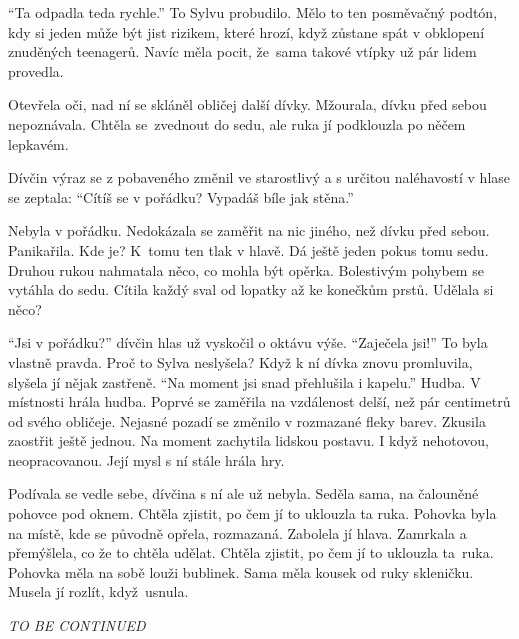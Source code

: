 \documentclass{article}
\begin{document}
	\enquote{Ta odpadla teda rychle.}
	To Sylvu probudilo.
	Mělo to ten posměvačný podtón, kdy si jeden může být jist rizikem,
	které hrozí, když zůstane spát v obklopení znuděných teenagerů.
	Navíc měla pocit, že~sama takové vtípky už pár lidem provedla.\par
	Otevřela oči, nad ní se skláněl obličej další dívky.
	Mžourala, dívku před sebou nepoznávala.
	Chtěla se~zvednout do sedu, ale ruka jí podklouzla po něčem lepkavém.\par
	Dívčin výraz se z pobaveného změnil ve starostlivý
	a s určitou naléhavostí v hlase se zeptala:
	\enquote{Cítíš se v pořádku? Vypadáš bíle jak stěna.}\par
	Nebyla v pořádku.
	Nedokázala se zaměřit na nic jiného, než dívku před sebou.
	Panikařila.
	Kde je?
	K~tomu ten tlak v hlavě.
	Dá ještě jeden pokus tomu sedu.
	Druhou rukou nahmatala něco, co mohla být opěrka.
	Bolestivým pohybem se vytáhla do sedu.
	Cítila každý sval od lopatky až ke konečkům prstů.
	Udělala si něco?\par
	\enquote{Jsi v pořádku?} dívčin hlas už vyskočil o oktávu výše.
	\enquote{Zaječela jsi!}
	To byla vlastně pravda.
	Proč to Sylva neslyšela? %
	Když k ní dívka znovu promluvila, slyšela jí nějak zastřeně.
	\enquote{Na moment jsi snad přehlušila i kapelu.}
	Hudba.
	V místnosti hrála hudba.
	Poprvé se zaměřila na vzdálenost delší,
	než pár centimetrů od svého obličeje.
	Nejasné pozadí se změnilo v rozmazané fleky barev.
	Zkusila zaostřit ještě jednou.
	Na moment zachytila lidskou postavu.
	I když nehotovou, neopracovanou.
	Její mysl s ní stále hrála hry.\par
	Podívala se vedle sebe, dívčina s ní ale už nebyla.
	Seděla sama, na čalouněné pohovce pod oknem.
	Chtěla zjistit, po čem jí to uklouzla ta ruka.
	Pohovka byla na místě, kde se původně opřela, rozmazaná.
	Zabolela jí hlava.
	Zamrkala a přemýšlela, co že to chtěla udělat.
	Chtěla zjistit, po čem jí to uklouzla ta~ruka.
	Pohovka měla na sobě louži bublinek.
	Sama měla kousek od ruky skleničku.
	Musela jí rozlít, když~usnula.\par
	\textit{TO BE CONTINUED}
\end{document}
